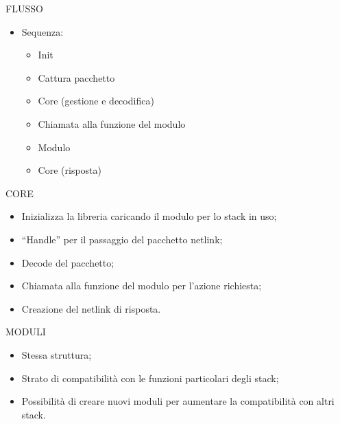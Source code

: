 \documentclass{beamer}
\begin{document}
\begin{frame}[fragile]{FLUSSO}
 \begin{itemize}
   \setlength\itemsep{2em}
     \item Sequenza:
     \vspace{0.5em}
        \begin{itemize}
        \setlength\itemsep{0.5em}
        \item Init
        \item Cattura pacchetto
        \item Core (gestione e decodifica)
        \item Chiamata alla funzione del modulo
				\item Modulo
				\item Core (risposta)
        \end{itemize}

 \end{itemize}
\end{frame}

\begin{frame}[fragile]{CORE}
	\begin{itemize}
			\item Inizializza la libreria caricando il modulo per lo stack in uso;
			\item ``Handle'' per il passaggio del pacchetto netlink;
			\item Decode del pacchetto;
			\item Chiamata alla funzione del modulo per l'azione richiesta;
			\item Creazione del netlink di risposta.

	\end{itemize}
\end{frame}

\begin{frame}[fragile]{MODULI}
	\begin{itemize}
      \item Stessa struttura;
      \item Strato di compatibilit\`a con le funzioni particolari degli stack;
      \item Possibilit\`a di creare nuovi moduli per aumentare la compatibilit\`a con altri stack.

  \end{itemize}
\end{frame}
\end{document}
